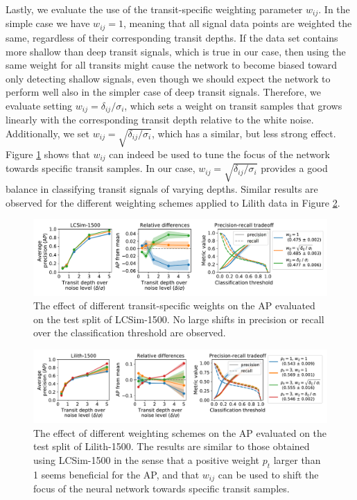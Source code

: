 Lastly, we evaluate the use of the transit-specific weighting parameter $w_{ij}$. In the simple case we have $w_{ij} = 1$, meaning that all signal data points are weighted the same, regardless of their corresponding transit depths. If the data set contains more shallow than deep transit signals, which is true in our case, then using the same weight for all transits might cause the network to become biased toward only detecting shallow signals, even though we should expect the network to perform well also in the simpler case of deep transit signals. Therefore, we evaluate setting $w_{ij} = \delta_{ij}/\sigma_i$, which sets a weight on transit samples that grows linearly with the corresponding transit depth relative to the white noise. Additionally, we set $w_{ij} = \sqrt{\delta_{ij}/\sigma_i}$, which has a similar, but less strong effect. Figure \ref{fig:lcsim_weight_w} shows that $w_{ij}$ can indeed be used to tune the focus of the network towards specific transit samples. In our case, $w_{ij} = \sqrt{\delta_{ij}/\sigma_i}$ provides a good balance in classifying transit signals of varying depths. Similar results are observed for the different weighting schemes applied to Lilith data in Figure \ref{fig:lilith_weighting}.

\begin{figure}
    \centering
    \includegraphics[width=0.95\linewidth]{Experiments/Figures/Models/lcsim1500_AP_weighting-w.pdf}
    \caption{The effect of different transit-specific weights on the AP evaluated on the test split of LCSim-1500. No large shifts in precision or recall over the classification threshold are observed. }
    \label{fig:lcsim_weight_w}
\end{figure}

\begin{figure}
    \centering
    \includegraphics[width=0.97\linewidth]{Experiments/Figures/Models/lilith1500_AP_weighting.pdf}
    \caption{The effect of different weighting schemes on the AP evaluated on the test split of Lilith-1500. The results are similar to those obtained using LCSim-1500 in the sense that a positive weight $p_t$ larger than 1 seems beneficial for the AP, and that $w_{ij}$ can be used to shift the focus of the neural network towards specific transit samples.}
    \label{fig:lilith_weighting}
\end{figure}
